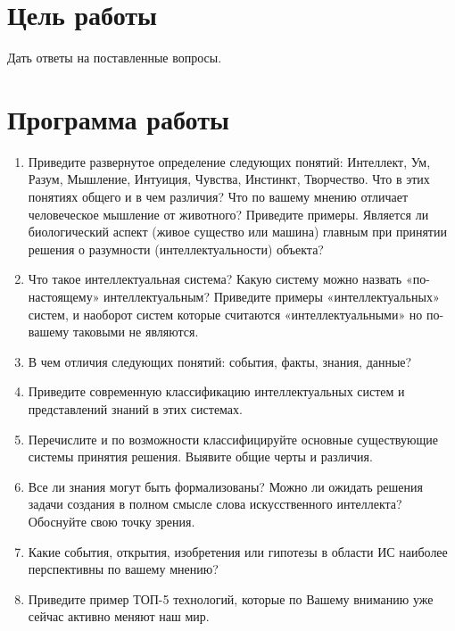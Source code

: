 \documentclass[14pt,a4paper,report]{report}
\begin{document}
\section{Цель работы}

Дать ответы на поставленные вопросы.

\section{Программа работы}

\begin{enumerate}
	\item Приведите развернутое определение следующих понятий: Интеллект, Ум, Разум, Мышление, Интуиция, Чувства, Инстинкт, Творчество. Что в этих понятиях общего и в чем различия? Что по вашему мнению отличает человеческое мышление от животного? Приведите
	примеры. Является ли биологический аспект (живое существо или машина) главным при принятии
	решения о разумности (интеллектуальности) объекта?
	
	\item Что такое интеллектуальная система? Какую систему можно назвать «по-настоящему»
	интеллектуальным? Приведите примеры «интеллектуальных» систем, и наоборот систем
	которые считаются «интеллектуальными» но по-вашему таковыми не являются.
	
	\item В чем отличия следующих понятий: события, факты, знания, данные?
	
	\item Приведите современную классификацию интеллектуальных систем и представлений знаний
	в этих системах.
	
	\item Перечислите и по возможности классифицируйте основные существующие системы принятия решения. Выявите общие черты и различия.
	
	\item Все ли знания могут быть формализованы? Можно ли ожидать решения задачи создания в
	полном смысле слова искусственного интеллекта? Обоснуйте свою точку зрения.
	
	\item Какие события, открытия, изобретения или гипотезы в области ИС наиболее перспективны по вашему мнению?
	
	\item Приведите пример ТОП-5 технологий, которые по Вашему вниманию уже сейчас активно
	меняют наш мир.
\end{enumerate}
\end{document}
